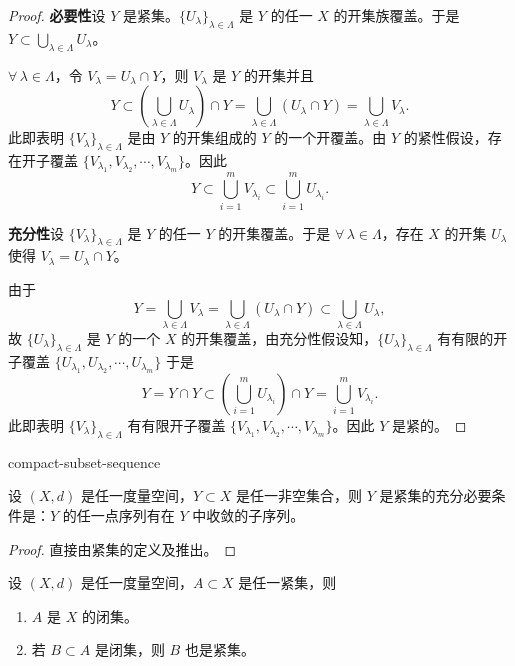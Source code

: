 \begin{proof}

\textbf{必要性}\quad 设 $Y$ 是紧集。$\{U_{\lambda}\}_{\lambda\in\Lambda}$ 是 $Y$ 的任一 $X$ 的开集族覆盖。于是 $Y\subset\displaystyle\bigcup_{\lambda\in\Lambda}U_{\lambda}$。

$\forall\,\lambda\in\Lambda$，令 $V_{\lambda}=U_{\lambda}\cap Y$，则 $V_{\lambda}$ 是 $Y$ 的开集并且
\[Y\subset\left(\bigcup_{\lambda\in\Lambda}U_{\lambda}\right)\cap Y=\bigcup_{\lambda\in\Lambda}(U_{\lambda}\cap Y)=\bigcup_{\lambda\in\Lambda}V_{\lambda}.\]
此即表明 $\{V_{\lambda}\}_{\lambda\in\Lambda}$ 是由 $Y$ 的开集组成的 $Y$ 的一个开覆盖。由 $Y$ 的紧性假设，存在开子覆盖 $\{V_{\lambda_1},V_{\lambda_2},\cdots,V_{\lambda_m}\}$。因此
\[Y\subset\bigcup_{i=1}^mV_{\lambda_i}\subset\bigcup_{i=1}^mU_{\lambda_i}.\]

\textbf{充分性}\quad 设 $\{V_{\lambda}\}_{\lambda\in\Lambda}$ 是 $Y$ 的任一 $Y$ 的开集覆盖。于是 $\forall\,\lambda\in\Lambda$，存在 $X$ 的开集 $U_{\lambda}$ 使得 $V_{\lambda}=U_{\lambda}\cap Y$。

由于
\[Y=\bigcup_{\lambda\in\Lambda}V_{\lambda}=\bigcup_{\lambda\in\Lambda}(U_{\lambda}\cap Y)\subset\bigcup_{\lambda\in\Lambda}U_{\lambda},\]
故 $\{U_{\lambda}\}_{\lambda\in\Lambda}$ 是 $Y$ 的一个 $X$ 的开集覆盖，由充分性假设知，$\{U_{\lambda}\}_{\lambda\in\Lambda}$ 有有限的开子覆盖 $\{U_{\lambda_1},U_{\lambda_2},\cdots,U_{\lambda_m}\}$ 于是
\[Y=Y\cap Y\subset\left(\bigcup_{i=1}^mU_{\lambda_i}\right)\cap Y=\bigcup_{i=1}^mV_{\lambda_i}.\]
此即表明 $\{V_{\lambda}\}_{\lambda\in\Lambda}$ 有有限开子覆盖 $\{V_{\lambda_1},V_{\lambda_2},\cdots,V_{\lambda_m}\}$。因此 $Y$ 是紧的。

\end{proof}

\begin{mythm}{}{compact-subset-sequence}

设 $(X,d)$ 是任一度量空间，$Y\subset X$ 是任一非空集合，则 $Y$ 是紧集的充分必要条件是：$Y$ 的任一点序列有在 $Y$ 中收敛的子序列。

\end{mythm}

\begin{proof}

直接由紧集的定义及推出。

\end{proof}

\begin{mycor*}{}

设 $(X,d)$ 是任一度量空间，$A\subset X$ 是任一紧集，则

\begin{enumerate}[label=\arabic{enumi})]
\item $A$ 是 $X$ 的闭集。
\item 若 $B\subset A$ 是闭集，则 $B$ 也是紧集。
\end{enumerate}

\end{mycor*}

